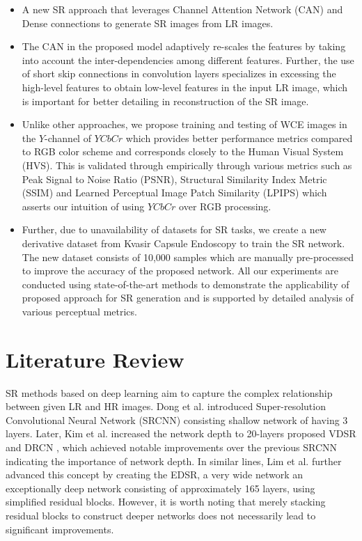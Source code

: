 \documentclass[conference]{IEEEtran}
\begin{document}
\begin{itemize}
    \item A new SR approach that leverages Channel Attention Network (CAN) and Dense connections to generate SR images from LR images. 
%    
    \item The CAN in the proposed model adaptively re-scales the features by taking into account the inter-dependencies among different features. Further, the use of short skip connections in convolution layers specializes in excessing the high-level features to obtain low-level features in the input LR image, which is important for better detailing in reconstruction of the SR image. 
    
    \item Unlike other approaches, we propose training and testing of WCE images in the $Y$-channel of $YCbCr$ which provides better performance metrics compared to RGB color scheme and corresponds closely to the Human Visual System (HVS). This is validated through empirically through various metrics such as Peak Signal to Noise Ratio (PSNR), Structural Similarity Index Metric (SSIM) and Learned Perceptual Image Patch Similarity (LPIPS) which asserts our intuition of using $YCbCr$ over RGB processing. 
    \item Further, due to unavailability of datasets for SR tasks, we create a new derivative dataset from Kvasir Capsule Endoscopy \cite{data} to train the SR network. The new dataset consists of 10,000 samples which are manually pre-processed to improve the accuracy of the proposed network. All our experiments are conducted using state-of-the-art methods to demonstrate the applicability of proposed approach for SR generation and is supported by detailed analysis of various perceptual metrics.
\end{itemize}




\section{Literature Review} 

 SR methods based on deep learning aim to capture the complex relationship between given LR and HR images. Dong et al. \cite{SRCNN} introduced Super-resolution Convolutional Neural Network (SRCNN) consisting shallow network of having 3 layers. Later, Kim et al. increased the network depth to 20-layers proposed VDSR \cite{VDSR} and DRCN \cite{DRCN}, which achieved notable improvements over the previous SRCNN indicating the importance of network depth. In similar lines, Lim et al.\cite{EDSR} further advanced this concept by creating the EDSR, a very wide network an exceptionally deep network consisting of approximately 165 layers, using simplified residual blocks. However, it is worth noting that merely stacking residual blocks to construct deeper networks does not necessarily lead to significant improvements. 
\end{document}
